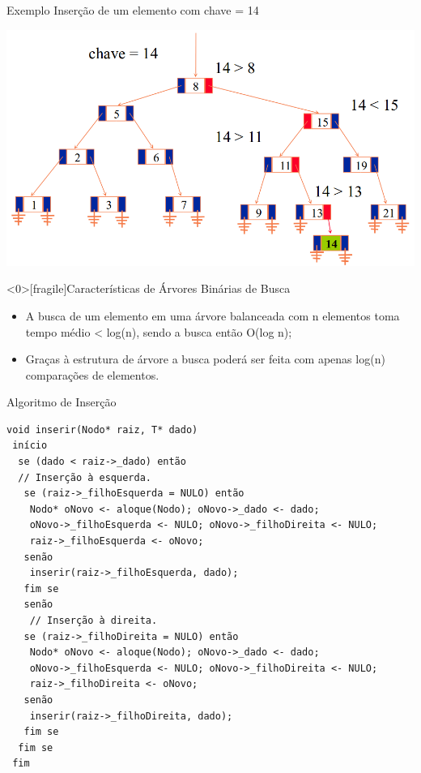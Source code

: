 \documentclass[12pt,table,xcolor={dvipsnames}]{beamer}
\begin{document}
\begin{frame}[fragile]{Exemplo}
Inserção de um elemento com chave = 14
\begin{center}
\includegraphics[scale=.3]{arv7.png} 
\end{center}
\end{frame}



\begin{frame}<0>[fragile]{Características de Árvores Binárias de Busca}
	\begin{itemize}
		\item A busca de um elemento em uma árvore balanceada com n elementos toma tempo médio < log(n), sendo a busca então O(log n);
		\item Graças à estrutura de árvore a busca poderá ser feita com apenas log(n) comparações de elementos.
	\end{itemize}
\end{frame}

\begin{frame}[fragile]{Algoritmo de Inserção}
          \begin{lstlisting}
void inserir(Nodo* raiz, T* dado)
 início
  se (dado < raiz->_dado) então
  // Inserção à esquerda.
   se (raiz->_filhoEsquerda = NULO) então
    Nodo* oNovo <- aloque(Nodo); oNovo->_dado <- dado;
    oNovo->_filhoEsquerda <- NULO; oNovo->_filhoDireita <- NULO;
    raiz->_filhoEsquerda <- oNovo;
   senão
    inserir(raiz->_filhoEsquerda, dado);
   fim se
   senão
    // Inserção à direita.
   se (raiz->_filhoDireita = NULO) então
    Nodo* oNovo <- aloque(Nodo); oNovo->_dado <- dado;
    oNovo->_filhoEsquerda <- NULO; oNovo->_filhoDireita <- NULO;
    raiz->_filhoDireita <- oNovo;
   senão
    inserir(raiz->_filhoDireita, dado);
   fim se
  fim se  
 fim
 \end{lstlisting}
\end{frame} 
\end{document}
